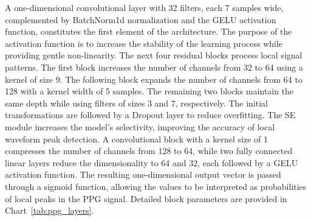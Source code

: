 \documentclass{citask}
\begin{document}
A one-dimensional convolutional layer with 32 filters, each 7 samples wide, complemented by BatchNorm1d normalization and the GELU activation function, constitutes the first element of the architecture. The purpose of the activation function is to increase the stability of the learning process while providing gentle non-linearity. The next four residual blocks process local signal patterns. The first block increases the number of channels from 32 to 64 using a kernel of size 9. The following block expands the number of channels from 64 to 128 with a kernel width of 5 samples. The remaining two blocks maintain the same depth while using filters of sizes 3 and 7, respectively. The initial transformations are followed by a Dropout layer to reduce overfitting.
The SE module increases the model’s selectivity, improving the accuracy of local waveform peak detection. A convolutional block with a kernel size of 1 compresses the number of channels from 128 to 64, while two fully connected linear layers reduce the dimensionality to 64 and 32, each followed by a GELU activation function. The resulting one-dimensional output vector is passed through a sigmoid function, allowing the values to be interpreted as probabilities of local peaks in the PPG signal. Detailed block parameters are provided in Chart~\ref{tab:ppg_layers}.
\end{document}
